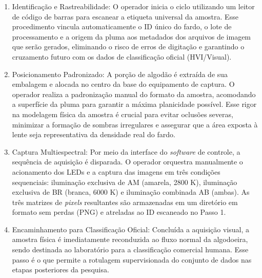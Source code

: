 \begin{enumerate}
    \item Identificação e Rastreabilidade: O operador inicia o ciclo utilizando um leitor de código de barras para escanear a etiqueta universal da amostra. Esse procedimento vincula automaticamente o ID único do fardo, o lote de processamento e a origem da pluma aos metadados dos arquivos de imagem que serão gerados, eliminando o risco de erros de digitação e garantindo o cruzamento futuro com os dados de classificação oficial (HVI/Visual).
    
    \item Posicionamento Padronizado: A porção de algodão é extraída de sua embalagem e alocada no centro da base do equipamento de captura. O operador realiza a padronização manual do formato da amostra, acomodando a superfície da pluma para garantir a máxima planicidade possível. Esse rigor na modelagem física da amostra é crucial para evitar oclusões severas, minimizar a formação de sombras irregulares e assegurar que a área exposta à lente seja representativa da densidade real do fardo.
    
    \item Captura Multiespectral: Por meio da interface do \textit{software} de controle, a sequência de aquisição é disparada. O operador orquestra manualmente o acionamento dos LEDs e a captura das imagens em três condições sequenciais: iluminação exclusiva de AM (amarela, 2800 K), iluminação exclusiva de BR (branca, 6000 K) e iluminação combinada AB (ambas). As três matrizes de \textit{pixels} resultantes são armazenadas em um diretório em formato sem perdas (PNG) e atreladas ao ID escaneado no Passo 1.

    \item Encaminhamento para Classificação Oficial: Concluída a aquisição visual, a amostra física é imediatamente reconduzida ao fluxo normal da algodoeira, sendo destinada ao laboratório para a classificação comercial humana. Esse passo é o que permite a rotulagem supervisionada do conjunto de dados nas etapas posteriores da pesquisa.
\end{enumerate}


